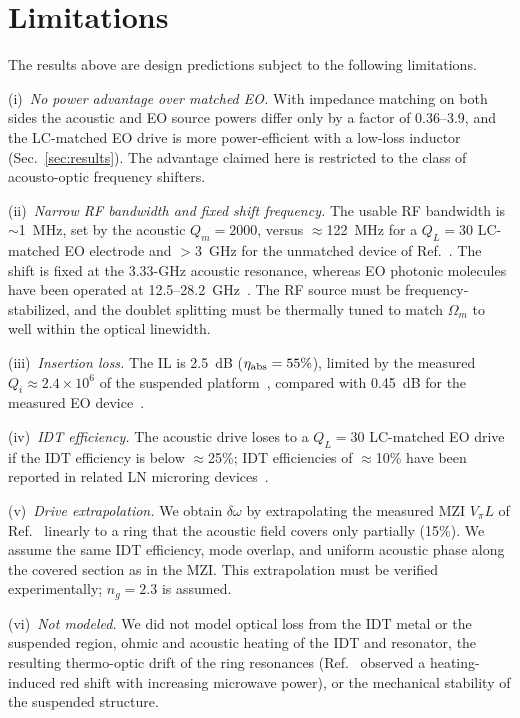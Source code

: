 \documentclass[aps,prapplied,reprint,superscriptaddress,amsmath,amssymb,floatfix]{revtex4-2}
\newcommand{\etaabs}{\eta_{\rm abs}}
\begin{document}
\section{Limitations}\label{sec:lim}
The results above are design predictions subject to the following limitations.

(i)~\emph{No power advantage over matched EO.} With impedance matching on both sides the acoustic and EO source powers differ only by a factor of 0.36--3.9, and the LC-matched EO drive is more power-efficient with a low-loss inductor (Sec.~\ref{sec:results}). The advantage claimed here is restricted to the class of acousto-optic frequency shifters.

(ii)~\emph{Narrow RF bandwidth and fixed shift frequency.} The usable RF bandwidth is $\sim$1~MHz, set by the acoustic $Q_m=2000$, versus $\approx$122~MHz for a $Q_L=30$ LC-matched EO electrode and $>$3~GHz for the unmatched device of Ref.~\cite{Hu2021}. The shift is fixed at the 3.33-GHz acoustic resonance, whereas EO photonic molecules have been operated at 12.5--28.2~GHz~\cite{Hu2021}. The RF source must be frequency-stabilized, and the doublet splitting must be thermally tuned to match $\Omega_m$ to well within the optical linewidth.

(iii)~\emph{Insertion loss.} The IL is 2.5~dB ($\etaabs=55\%$), limited by the measured $Q_i\approx2.4\times10^6$ of the suspended platform~\cite{Shao2019}, compared with 0.45~dB for the measured EO device~\cite{Hu2021}.

(iv)~\emph{IDT efficiency.} The acoustic drive loses to a $Q_L=30$ LC-matched EO drive if the IDT efficiency is below $\approx$25\%; IDT efficiencies of $\approx$10\% have been reported in related LN microring devices~\cite{Xu2025b}.

(v)~\emph{Drive extrapolation.} We obtain $\delta\omega$ by extrapolating the measured MZI $V_\pi L$ of Ref.~\cite{Shao2019} linearly to a ring that the acoustic field covers only partially (15\%). We assume the same IDT efficiency, mode overlap, and uniform acoustic phase along the covered section as in the MZI. This extrapolation must be verified experimentally; $n_g=2.3$ is assumed.

(vi)~\emph{Not modeled.} We did not model optical loss from the IDT metal or the suspended region, ohmic and acoustic heating of the IDT and resonator, the resulting thermo-optic drift of the ring resonances (Ref.~\cite{Shao2019} observed a heating-induced red shift with increasing microwave power), or the mechanical stability of the suspended structure.
\end{document}
